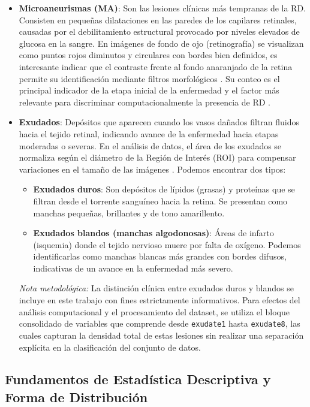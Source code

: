 \begin{itemize}
    \item \textbf{Microaneurismas (MA)}: Son las lesiones clínicas más tempranas de la RD. Consisten en pequeñas dilataciones en las paredes de los capilares retinales, causadas por el debilitamiento estructural provocado por niveles elevados de glucosa en la sangre. En imágenes de fondo de ojo (retinografía) se visualizan como puntos rojos diminutos y circulares con bordes bien definidos, es interesante indicar que el  contraste frente al fondo anaranjado de la retina permite su identificación mediante filtros morfológicos \parencite{antal2014ensemble}. Su conteo es el principal indicador de la etapa inicial de la enfermedad y el factor más relevante para discriminar computacionalmente la presencia de RD \parencite{casanova2014application}.

    \item \textbf{Exudados}: Depósitos que aparecen cuando los vasos dañados filtran fluidos hacia el tejido retinal, indicando avance de la enfermedad hacia etapas moderadas o severas. En el análisis de datos, el área de los exudados se normaliza según el diámetro de la Región de Interés (ROI) para compensar variaciones en el tamaño de las imágenes \parencite{antal2014dataset}. Podemos encontrar dos tipos:
    \begin{itemize}
        \item \textbf{Exudados duros}: Son depósitos de lípidos (grasas) y proteínas que se filtran desde el torrente sanguíneo hacia la retina. Se presentan como manchas pequeñas, brillantes y de tono amarillento.
        \item \textbf{Exudados blandos (manchas algodonosas)}: Áreas de infarto (isquemia) donde el tejido nervioso muere por falta de oxígeno. Podemos identificarlas como manchas blancas más grandes con bordes difusos, indicativas de un avance en la enfermedad más severo.
    \end{itemize}
    \textit{Nota metodológica:} La distinción clínica entre exudados duros y blandos se incluye en este trabajo con fines estrictamente informativos. Para efectos del análisis computacional y el procesamiento del dataset, se utiliza el bloque consolidado de variables que comprende desde \texttt{exudate1} hasta \texttt{exudate8}, las cuales capturan la densidad total de estas lesiones sin realizar una separación explícita en la clasificación del conjunto de datos.
\end{itemize}

\subsection{Fundamentos de Estadística Descriptiva y Forma de Distribución}

